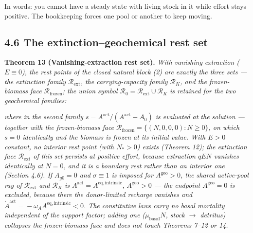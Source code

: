 \documentclass[11pt]{article}
\begin{document}
In words: you cannot have a steady state with living stock in it while effort stays positive. The bookkeeping forces one pool or another to keep moving.

\subsection*{4.6 The extinction--geochemical rest set}\label{46-the-extinction--geochemical-rest-set}

\textbf{Theorem 13 (Vanishing-extraction rest set).} \emph{With vanishing extraction (\(E \equiv 0\)), the rest points of the closed natural block (2) are exactly the three sets --- the extinction family \(\mathcal{R}_{\mathrm{ext}}\), the carrying-capacity family \(\mathcal{R}_K\), and the frozen-biomass face \(\mathcal{R}_{\mathrm{frozen}}\); the union symbol \(\mathcal{R}_0 =\allowbreak{} \mathcal{R}_{\mathrm{ext}} \cup \mathcal{R}_K\) is retained for the two geochemical families:} 

\par\noindent{}\par

 \emph{where in the second family \(s =\allowbreak{} A^{\mathrm{act}}/(A^{\mathrm{act}} +\allowbreak{} A_0)\) is evaluated at the solution --- together with the frozen-biomass face \(\mathcal{R}_{\mathrm{frozen}} =\allowbreak{} \{(N,\allowbreak{} 0,\allowbreak{} 0,\allowbreak{} 0) : N \ge 0\}\), on which \(s = 0\) identically and the biomass is frozen at its initial value. With \(E > 0\) constant, no interior rest point (with \(N_* > 0\)) exists (Theorem 12); the extinction face \(\mathcal{R}_{\mathrm{ext}}\) of this set persists at positive effort, because extraction \(qEN\) vanishes identically at \(N = 0\), and it is a boundary rest rather than an interior one (Section 4.6). If \(A_{g0} = 0\) and \(\sigma \equiv 1\) is imposed for \(A^{\mathrm{geo}} > 0\), the shared active-pool ray of \(\mathcal{R}_{\mathrm{ext}}\) and \(\mathcal{R}_K\) is \(A^{\mathrm{act}} =\allowbreak{} A^{\mathrm{eq,\allowbreak{}intrinsic}}\), \(A^{\mathrm{geo}} > 0\) --- the endpoint \(A^{\mathrm{geo}} = 0\) is excluded, because there the donor-limited recharge vanishes and \(\dot A^{\mathrm{act}} =\allowbreak{} -\omega_A A^{\mathrm{eq,\allowbreak{}intrinsic}} < 0\). The constitutive laws carry no basal mortality independent of the support factor; adding one (\(\mu_{\mathrm{basal}} N\), stock \(\to\) detritus) collapses the frozen-biomass face and does not touch Theorems 7--12 or 14.}
\end{document}
